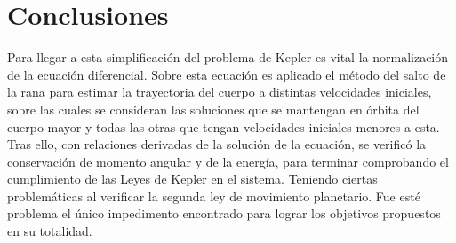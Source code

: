 \documentclass[../portafolio.tex]{subfiles}
\begin{document}
\section*{Conclusiones}
Para llegar a esta simplificación del problema de Kepler es vital la normalización de la ecuación diferencial. Sobre esta ecuación es aplicado el método del salto de la rana para estimar la trayectoria del cuerpo a distintas velocidades iniciales, sobre las cuales se consideran las soluciones que se mantengan en órbita del cuerpo mayor y todas las otras que tengan velocidades iniciales menores a esta. Tras ello, con relaciones derivadas de la solución de la ecuación, se verificó la conservación de momento angular y de la energía, para terminar comprobando el cumplimiento de las Leyes de Kepler en el sistema. Teniendo ciertas problemáticas al verificar la segunda ley de movimiento planetario.
Fue esté problema el único impedimento encontrado para lograr los objetivos propuestos en su totalidad.
\end{document}
